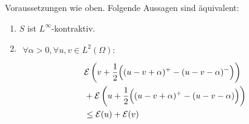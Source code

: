\begin{beispiel}
	\begin{korollar}
		Voraussetzungen wie oben.
		Folgende Aussagen sind äquivalent:
		\begin{enumerate}[label=(\roman*)]
			\item $S$ ist $L^\infty$-kontraktiv.
			\item $\begin{aligned}
				\forall\alpha>0,\forall u,v\in L^2(\Omega):
			\end{aligned}$
			\begin{align*}
				&\mathcal{E}\left(v+\frac{1}{2}\Big((u-v+\alpha)^+-(u-v-\alpha)^-\Big)\right)\\
				&+\mathcal{E}\left(u+\frac{1}{2}\Big((u-v+\alpha)^+-(u-v-\alpha)\Big)\right)\\
				&\leq\mathcal{E}(u)+\mathcal{E}(v)
			\end{align*}
		\end{enumerate}
	\end{korollar}
\end{beispiel}

